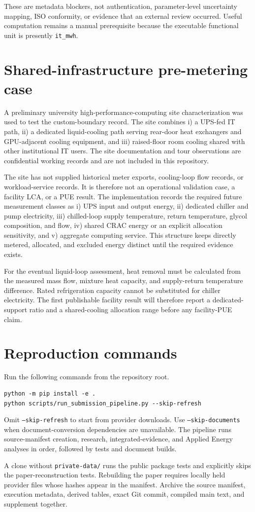 \documentclass[review,a4paper,fleqn]{cas-sc}
\begin{document}
These are metadata blockers, not authentication, parameter-level uncertainty mapping, ISO conformity, or evidence that an external review occurred. Useful computation remains a manual prerequisite because the executable functional unit is presently \texttt{it\_mwh}.

\section{Shared-infrastructure pre-metering case}
A preliminary university high-performance-computing site characterization was used to test the custom-boundary record. The site combines i) a UPS-fed IT path, ii) a dedicated liquid-cooling path serving rear-door heat exchangers and GPU-adjacent cooling equipment, and iii) raised-floor room cooling shared with other institutional IT users. The site documentation and tour observations are confidential working records and are not included in this repository.

The site has not supplied historical meter exports, cooling-loop flow records, or workload-service records. It is therefore not an operational validation case, a facility LCA, or a PUE result. The implementation records the required future measurement classes as i) UPS input and output energy, ii) dedicated chiller and pump electricity, iii) chilled-loop supply temperature, return temperature, glycol composition, and flow, iv) shared CRAC energy or an explicit allocation sensitivity, and v) aggregate computing service. This structure keeps directly metered, allocated, and excluded energy distinct until the required evidence exists.

For the eventual liquid-loop assessment, heat removal must be calculated from the measured mass flow, mixture heat capacity, and supply-return temperature difference. Rated refrigeration capacity cannot be substituted for chiller electricity. The first publishable facility result will therefore report a dedicated-support ratio and a shared-cooling allocation range before any facility-PUE claim.

\section{Reproduction commands}
Run the following commands from the repository root.

\begin{verbatim}
python -m pip install -e .
python scripts/run_submission_pipeline.py --skip-refresh
\end{verbatim}

Omit \texttt{--skip-refresh} to start from provider downloads. Use \texttt{--skip-documents} when document-conversion dependencies are unavailable. The pipeline runs source-manifest creation, research, integrated-evidence, and Applied Energy analyses in order, followed by tests and document builds.

A clone without \texttt{private-data/} runs the public package tests and explicitly skips the paper-reconstruction tests. Rebuilding the paper requires locally held provider files whose hashes appear in the manifest. Archive the source manifest, execution metadata, derived tables, exact Git commit, compiled main text, and supplement together.
\end{document}
